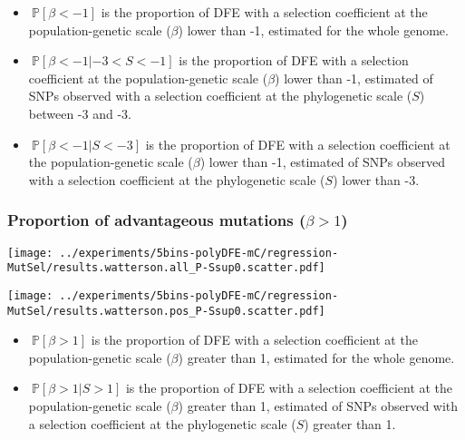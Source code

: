 \documentclass{article}
\newcommand{\proba}{\mathbb{P}}
\newcommand{\Sphy}{S}
\newcommand{\divStrongDel}{\Sphy < -3}
\newcommand{\divDel}{-3 < \Sphy < -1}
\newcommand{\divAdv}{ \Sphy > 1}
\newcommand{\Spop}{\beta}
\newcommand{\polyDel}{\Spop < -1}
\newcommand{\polyAdv}{ \Spop > 1}
\begin{document}
    \begin{itemize}
        \item $\ \proba [ \polyDel ]$ is the proportion of DFE with a selection coefficient at the population-genetic scale ($\Spop$) lower than -1, estimated for the whole genome.
        \item $\ \proba [ \polyDel | \divDel]$ is the proportion of DFE with a selection coefficient at the population-genetic scale ($\Spop$) lower than -1, estimated of SNPs observed with a selection coefficient at the phylogenetic scale ($\Sphy$) between -3 and -3.
        \item $\ \proba [ \polyDel | \divStrongDel ]$ is the proportion of DFE with a selection coefficient at the population-genetic scale ($\Spop$) lower than -1, estimated of SNPs observed with a selection coefficient at the phylogenetic scale ($\Sphy$) lower than -3.
    \end{itemize}

    \subsubsection{Proportion of advantageous mutations ($\polyAdv$)}\label{subsec:proportion-advantageous-mutations}

    \begin{minipage}{0.32\linewidth}
        \texttt{[image: ../experiments/5bins-polyDFE-mC/regression-MutSel/results.watterson.all\_P-Ssup0.scatter.pdf]}
    \end{minipage}
    \begin{minipage}{0.32\linewidth}
        \texttt{[image: ../experiments/5bins-polyDFE-mC/regression-MutSel/results.watterson.pos\_P-Ssup0.scatter.pdf]}
    \end{minipage}

    \begin{itemize}
        \item $\ \proba [ \polyAdv  ]$ is the proportion of DFE with a selection coefficient at the population-genetic scale ($\Spop$) greater than 1, estimated for the whole genome.
        \item $\ \proba [ \polyAdv | \divAdv] $ is the proportion of DFE with a selection coefficient at the population-genetic scale ($\Spop$) greater than 1, estimated of SNPs observed with a selection coefficient at the phylogenetic scale ($\Sphy$) greater than 1.
    \end{itemize}
\end{document}
